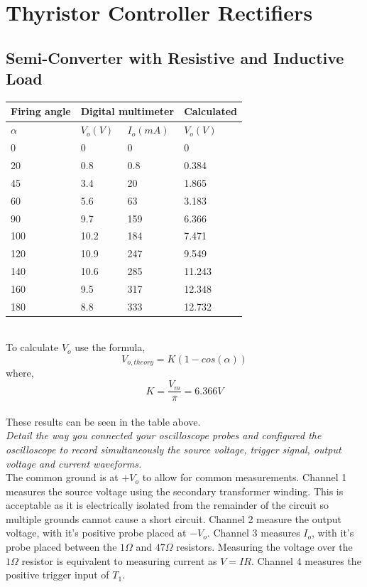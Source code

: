 \documentclass[12pt,a4paper]{article}
\begin{document}
\section{Thyristor Controller Rectifiers}
\subsection{Semi-Converter with Resistive and Inductive Load}
\begin{center}
\begin{tabular}{|p{3cm}|p{2.5cm}|p{2.5cm}|p{2.5cm}|}
\hline
\centering\textbf{Firing angle} &
\multicolumn{2}{c|}{\textbf{Digital multimeter}} &
\centering\textbf{Calculated} \tabularnewline
\hline
\centering$\alpha$ & \centering$V_o(V)$ & \centering$I_o(mA)$ & \centering$V_o(V)$ \tabularnewline
\hline
0 & 0 & 0 & 0 \\ \hline
20 & 0.8 & 0.8 & 0.384 \\ \hline
45 & 3.4 & 20 & 1.865 \\ \hline
60 & 5.6 & 63 & 3.183 \\ \hline
90 & 9.7 & 159 & 6.366 \\ \hline
100 & 10.2 & 184 & 7.471 \\ \hline
120 & 10.9 & 247 & 9.549 \\ \hline
140 & 10.6 & 285 & 11.243 \\ \hline
160 & 9.5 & 317 & 12.348 \\ \hline
180 & 8.8 & 333 & 12.732 \\ \hline
\end{tabular}
\end{center}\\
To calculate $V_o$ use the formula,
$$V_{o,theory}=K(1-cos(\alpha))$$
where,\\
$$K=\dfrac{V_m}{\pi}=6.366V$$\\
These results can be seen in the table above.\\

\textit{Detail the way you connected your oscilloscope probes and configured the oscilloscope to record simultaneously the source voltage, trigger signal, output voltage and current waveforms.}\\

The common ground is at $+V_o$ to allow for common measurements. Channel 1 measures the source voltage using the secondary transformer winding. This is acceptable as it is electrically isolated from the remainder of the circuit so multiple grounds cannot cause a short circuit. Channel 2 measure the output voltage, with it's positive probe placed at $-V_o$. Channel 3 measures $I_o$, with it's probe placed between the $1\Omega$ and $47\Omega$ resistors. Measuring the voltage over the $1\Omega$ resistor is equivalent to measuring current as $V=IR$. Channel 4 measures the positive trigger input of $T_1$. \\ 
\end{document}
